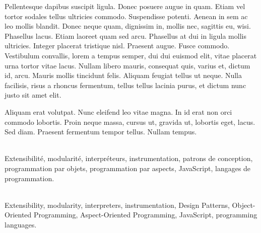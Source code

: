 \begin{titlepage}
\begin{addmargin}[-1cm]{-4cm}
\begin{minipage}[t]{9cm}
Pellentesque dapibus suscipit ligula.  Donec posuere augue in quam.  Etiam vel
tortor sodales tellus ultricies commodo.  Suspendisse potenti.  Aenean in sem ac
leo mollis blandit.  Donec neque quam, dignissim in, mollis nec, sagittis eu,
wisi.  Phasellus lacus.  Etiam laoreet quam sed arcu.  Phasellus at dui in
ligula mollis ultricies.  Integer placerat tristique nisl.  Praesent augue.
Fusce commodo.  Vestibulum convallis, lorem a tempus semper, dui dui euismod
elit, vitae placerat urna tortor vitae lacus.  Nullam libero mauris, consequat
quis, varius et, dictum id, arcu.  Mauris mollis tincidunt felis.  Aliquam
feugiat tellus ut neque.  Nulla facilisis, risus a rhoncus fermentum, tellus
tellus lacinia purus, et dictum nunc justo sit amet elit.

Aliquam erat volutpat.  Nunc eleifend leo vitae magna.  In id erat non orci
commodo lobortis.  Proin neque massa, cursus ut, gravida ut, lobortis eget,
lacus.  Sed diam.  Praesent fermentum tempor tellus.  Nullam tempus.
\end{minipage}

\vfill
\noindent
\begin{minipage}[t]{9cm}
\\
Extensibilité, modularité, interpréteurs, instrumentation, patrons de
conception, programmation par objets, programmation par aspects, JavaScript,
langages de programmation.
\end{minipage}%
\hspace{1cm}
\begin{minipage}[t]{9cm}
\\
Extensibility, modularity, interpreters, instrumentation, Design Patterns,
Object-Oriented Programming, Aspect-Oriented Programming, JavaScript,
programming languages.
\end{minipage}
\end{addmargin}
\end{titlepage}


